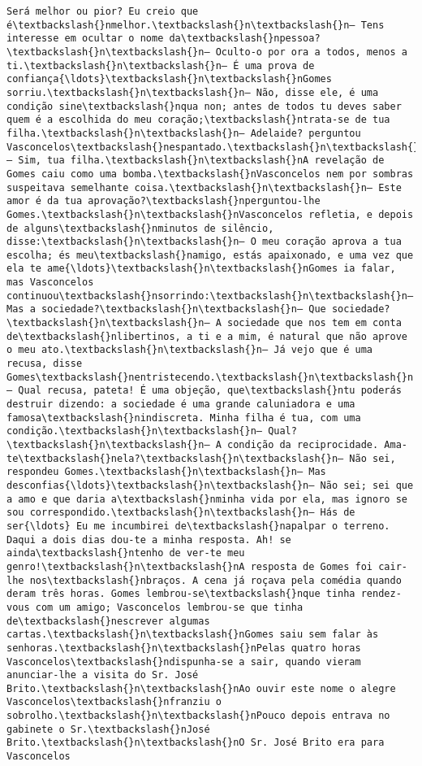 \documentclass[11pt]{article}
\begin{document}
\begin{Verbatim}[commandchars=\\\{\}]
Será melhor ou pior? Eu creio que é\textbackslash{}nmelhor.\textbackslash{}n\textbackslash{}n— Tens interesse em ocultar o nome da\textbackslash{}npessoa?\textbackslash{}n\textbackslash{}n— Oculto-o por ora a todos, menos a ti.\textbackslash{}n\textbackslash{}n— É uma prova de confiança{\ldots}\textbackslash{}n\textbackslash{}nGomes sorriu.\textbackslash{}n\textbackslash{}n— Não, disse ele, é uma condição sine\textbackslash{}nqua non; antes de todos tu deves saber quem é a escolhida do meu coração;\textbackslash{}ntrata-se de tua filha.\textbackslash{}n\textbackslash{}n— Adelaide? perguntou Vasconcelos\textbackslash{}nespantado.\textbackslash{}n\textbackslash{}n— Sim, tua filha.\textbackslash{}n\textbackslash{}nA revelação de Gomes caiu como uma bomba.\textbackslash{}nVasconcelos nem por sombras suspeitava semelhante coisa.\textbackslash{}n\textbackslash{}n— Este amor é da tua aprovação?\textbackslash{}nperguntou-lhe Gomes.\textbackslash{}n\textbackslash{}nVasconcelos refletia, e depois de alguns\textbackslash{}nminutos de silêncio, disse:\textbackslash{}n\textbackslash{}n— O meu coração aprova a tua escolha; és meu\textbackslash{}namigo, estás apaixonado, e uma vez que ela te ame{\ldots}\textbackslash{}n\textbackslash{}nGomes ia falar, mas Vasconcelos continuou\textbackslash{}nsorrindo:\textbackslash{}n\textbackslash{}n— Mas a sociedade?\textbackslash{}n\textbackslash{}n— Que sociedade?\textbackslash{}n\textbackslash{}n— A sociedade que nos tem em conta de\textbackslash{}nlibertinos, a ti e a mim, é natural que não aprove o meu ato.\textbackslash{}n\textbackslash{}n— Já vejo que é uma recusa, disse Gomes\textbackslash{}nentristecendo.\textbackslash{}n\textbackslash{}n— Qual recusa, pateta! É uma objeção, que\textbackslash{}ntu poderás destruir dizendo: a sociedade é uma grande caluniadora e uma famosa\textbackslash{}nindiscreta. Minha filha é tua, com uma condição.\textbackslash{}n\textbackslash{}n— Qual?\textbackslash{}n\textbackslash{}n— A condição da reciprocidade. Ama-te\textbackslash{}nela?\textbackslash{}n\textbackslash{}n— Não sei, respondeu Gomes.\textbackslash{}n\textbackslash{}n— Mas desconfias{\ldots}\textbackslash{}n\textbackslash{}n— Não sei; sei que a amo e que daria a\textbackslash{}nminha vida por ela, mas ignoro se sou correspondido.\textbackslash{}n\textbackslash{}n— Hás de ser{\ldots} Eu me incumbirei de\textbackslash{}napalpar o terreno. Daqui a dois dias dou-te a minha resposta. Ah! se ainda\textbackslash{}ntenho de ver-te meu genro!\textbackslash{}n\textbackslash{}nA resposta de Gomes foi cair-lhe nos\textbackslash{}nbraços. A cena já roçava pela comédia quando deram três horas. Gomes lembrou-se\textbackslash{}nque tinha rendez-vous com um amigo; Vasconcelos lembrou-se que tinha de\textbackslash{}nescrever algumas cartas.\textbackslash{}n\textbackslash{}nGomes saiu sem falar às senhoras.\textbackslash{}n\textbackslash{}nPelas quatro horas Vasconcelos\textbackslash{}ndispunha-se a sair, quando vieram anunciar-lhe a visita do Sr. José Brito.\textbackslash{}n\textbackslash{}nAo ouvir este nome o alegre Vasconcelos\textbackslash{}nfranziu o sobrolho.\textbackslash{}n\textbackslash{}nPouco depois entrava no gabinete o Sr.\textbackslash{}nJosé Brito.\textbackslash{}n\textbackslash{}nO Sr. José Brito era para Vasconcelos 
\end{Verbatim}
\end{document}
